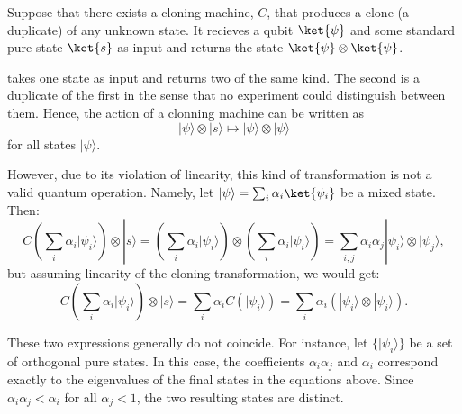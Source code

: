 Suppose that there exists a cloning machine, $C$, that produces a clone (a duplicate) of any unknown state. It recieves a qubit $\ket{\psi}$ and some standard pure state $\ket{s}$ as input and returns the state $\ket{\psi} \otimes \ket{\psi}$.

takes one state as input and returns two of the same kind. The second is a duplicate of the first in the sense that no experiment could distinguish between them. Hence, the action of a clonning machine can be written as
\[
|\psi\rangle \otimes |s\rangle \mapsto |\psi\rangle \otimes |\psi\rangle
\]
for all states $|\psi\rangle$.

However, due to its violation of linearity, this kind of transformation is not a valid quantum operation. Namely, let $|\psi\rangle = \sum_i \alpha_i \ket{\psi_i}$ be a mixed state. Then:
\begin{equation*}
C \left( \sum_i \alpha_i |\psi_i\rangle \right) \otimes |s\rangle 
=
 \left( \sum_i \alpha_i |\psi_i\rangle \right) \otimes  \left( \sum_i \alpha_i |\psi_i\rangle \right)  =  \sum_{i,j} \alpha_i \alpha_j |\psi_i\rangle \otimes |\psi_j\rangle,
\end{equation*}
but assuming linearity of the cloning transformation, we would get:
\begin{equation*}
 C \left( \sum_i \alpha_i |\psi_i\rangle \right)  \otimes |s\rangle =  \sum_i \alpha_i C \left(|\psi_i\rangle \right)
=
\sum_i \alpha_i \left( |\psi_i\rangle \otimes |\psi_i\rangle \right).
\end{equation*}

These two expressions generally do not coincide. For instance, let $\{|\psi_i\rangle\}$ be a set of orthogonal pure states. In this case, the coefficients $\alpha_i \alpha_j $ and $\alpha_i$ correspond exactly to the eigenvalues of the final states in the equations above. Since $ \alpha_i \alpha_j < \alpha_i$ for all $\alpha_j< 1$, the two resulting states are distinct.


